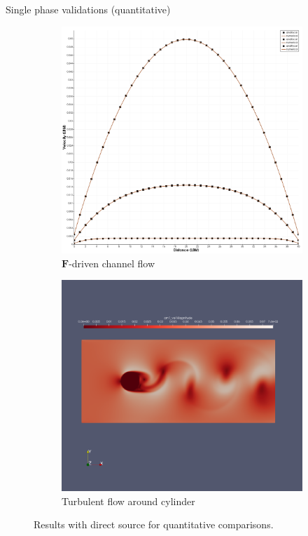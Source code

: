 \documentclass{beamer}
\begin{document}
	\begin{frame}{Single phase validations (quantitative)}
		\begin{figure}[h]
			\centering
			\begin{subfigure}{.5\textwidth}
				\centering
				\includegraphics[width=.9\linewidth]{pics/channelForceDrivenValidation.png}
				\caption{$\mathbf{F}$-driven channel flow}
				\label{fig:sub1}
			\end{subfigure}%
			\begin{subfigure}{.5\textwidth}
				\centering
				\includegraphics[width=.9\linewidth]{pics/cylinderTurbulent.png}
				\caption{Turbulent flow around cylinder}
				\label{fig:sub2}
			\end{subfigure}
			\caption{Results with direct source for quantitative comparisons.}
			\label{fig:osci}
		\end{figure}
	\end{frame}
	
\end{document}
